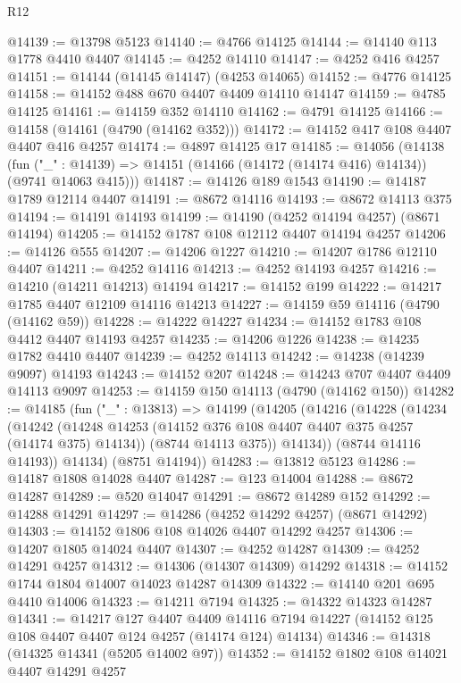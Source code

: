 \begin{lexlean}{R12}
\begin{coremodule}
@14139 := @13798 @5123
@14140 := @4766 @14125
@14144 := @14140 @113 @1778 @4410 @4407
@14145 := @4252 @14110
@14147 := @4252 @416 @4257
@14151 := @14144 (@14145 @14147) (@4253 @14065)
@14152 := @4776 @14125
@14158 := @14152 @488 @670 @4407 @4409 @14110 @14147
@14159 := @4785 @14125
@14161 := @14159 @352 @14110
@14162 := @4791 @14125
@14166 := @14158 (@14161 (@4790 (@14162 @352)))
@14172 := @14152 @417 @108 @4407 @4407 @416 @4257
@14174 := @4897 @14125 @17
@14185 := @14056
    (@14138
      (fun ("_" : @14139) => @14151 (@14166 (@14172 (@14174 @416) @14134)) (@9741 @14063 @415)))
@14187 := @14126 @189 @1543
@14190 := @14187 @1789 @12114 @4407
@14191 := @8672 @14116
@14193 := @8672 @14113 @375
@14194 := @14191 @14193
@14199 := @14190 (@4252 @14194 @4257) (@8671 @14194)
@14205 := @14152 @1787 @108 @12112 @4407 @14194 @4257
@14206 := @14126 @555
@14207 := @14206 @1227
@14210 := @14207 @1786 @12110 @4407
@14211 := @4252 @14116
@14213 := @4252 @14193 @4257
@14216 := @14210 (@14211 @14213) @14194
@14217 := @14152 @199
@14222 := @14217 @1785 @4407 @12109 @14116 @14213
@14227 := @14159 @59 @14116 (@4790 (@14162 @59))
@14228 := @14222 @14227
@14234 := @14152 @1783 @108 @4412 @4407 @14193 @4257
@14235 := @14206 @1226
@14238 := @14235 @1782 @4410 @4407
@14239 := @4252 @14113
@14242 := @14238 (@14239 @9097) @14193
@14243 := @14152 @207
@14248 := @14243 @707 @4407 @4409 @14113 @9097
@14253 := @14159 @150 @14113 (@4790 (@14162 @150))
@14282 := @14185
    (fun ("_" : @13813) =>
    @14199
      (@14205
        (@14216
          (@14228
            (@14234
              (@14242
                (@14248 @14253 (@14152 @376 @108 @4407 @4407 @375 @4257 (@14174 @375) @14134))
                (@8744 @14113 @375))
              @14134))
          (@8744 @14116 @14193))
        @14134)
      (@8751 @14194))
@14283 := @13812 @5123
@14286 := @14187 @1808 @14028 @4407
@14287 := @123 @14004
@14288 := @8672 @14287
@14289 := @520 @14047
@14291 := @8672 @14289 @152
@14292 := @14288 @14291
@14297 := @14286 (@4252 @14292 @4257) (@8671 @14292)
@14303 := @14152 @1806 @108 @14026 @4407 @14292 @4257
@14306 := @14207 @1805 @14024 @4407
@14307 := @4252 @14287
@14309 := @4252 @14291 @4257
@14312 := @14306 (@14307 @14309) @14292
@14318 := @14152 @1744 @1804 @14007 @14023 @14287 @14309
@14322 := @14140 @201 @695 @4410 @14006
@14323 := @14211 @7194
@14325 := @14322 @14323 @14287
@14341 := @14217
    @127
    @4407
    @4409
    @14116
    @7194
    @14227
    (@14152 @125 @108 @4407 @4407 @124 @4257 (@14174 @124) @14134)
@14346 := @14318 (@14325 @14341 (@5205 @14002 @97))
@14352 := @14152 @1802 @108 @14021 @4407 @14291 @4257

\end{coremodule}
\end{lexlean}
